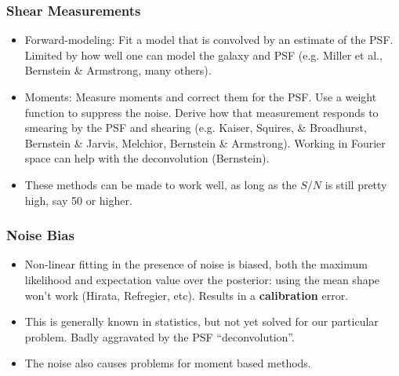 \documentclass{beamer}
\begin{document}



\frame
{
    \frametitle{Shear Measurements}
    
    \begin{itemize}

        \item Forward-modeling: Fit a model that is convolved by an estimate of
            the PSF. Limited by how well one can model the galaxy and PSF (e.g.
            Miller et al., Bernstein \& Armstrong, many others).

        \item Moments: Measure moments and correct them for the PSF.  Use a
            weight function to suppress the noise. Derive how that measurement
            responds to smearing by the PSF and shearing (e.g.  Kaiser,
            Squires, \& Broadhurst, Bernstein \& Jarvis, Melchior, Bernstein \&
            Armstrong).  Working in Fourier space can help with the
            deconvolution (Bernstein).

        \item These methods can be made to work well, as long as the $S/N$ is
            still pretty high, say 50 or higher.

    \end{itemize}
}

\frame
{
    \frametitle{Noise Bias}

    \begin{itemize}

        \item Non-linear fitting in the presence of noise is biased, both the
            maximum likelihood and expectation value over the posterior: using
            the mean shape won't work (Hirata, Refregier, etc).   Results in a
            {\bf calibration} error.

        \item This is generally known in statistics, but not yet solved for our
            particular problem. Badly aggravated by the PSF ``deconvolution''.

        \item The noise also causes problems for moment based methods.

    \end{itemize}
}
\end{document}
